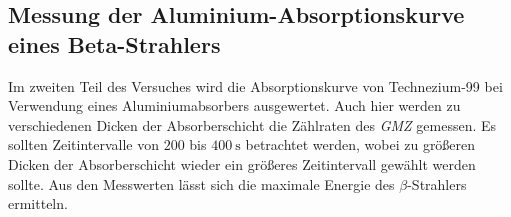 \subsection{Messung der Aluminium-Absorptionskurve eines Beta-Strahlers}
Im zweiten Teil des Versuches wird die Absorptionskurve von Technezium-99 bei Verwendung eines Aluminiumabsorbers ausgewertet. Auch hier werden zu verschiedenen Dicken 
der Absorberschicht die Zählraten des \textit{GMZ} gemessen. Es sollten Zeitintervalle von $200$ bis $\qty{400}{\second}$ betrachtet werden, wobei zu größeren Dicken der
Absorberschicht wieder ein größeres Zeitintervall gewählt werden sollte.
Aus den Messwerten lässt sich die maximale Energie des $\beta$-Strahlers ermitteln.
